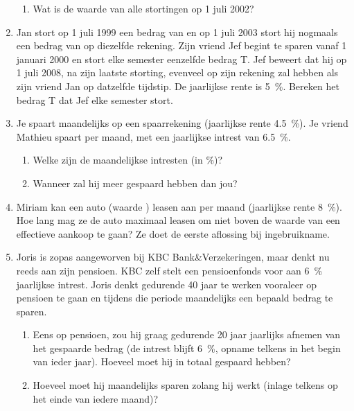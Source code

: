 \begin{enumerate}
\begin{enumerate}
        \item  Wat is de waarde van alle stortingen op 1 juli 2002?
    \end{enumerate}


      \item   Jan stort op 1 juli 1999 een bedrag van  en op 1
    juli 2003 stort hij nogmaals een bedrag van  op
    diezelfde rekening. Zijn vriend Jef begint te sparen vanaf 1
    januari 2000 en stort elke semester eenzelfde bedrag T.  Jef beweert
    dat hij op 1 juli 2008, na zijn laatste storting, evenveel op
    zijn rekening zal hebben als zijn vriend Jan op datzelfde tijdstip.
    De jaarlijkse rente is \SI{5}{\percent}.  Bereken het bedrag T dat Jef elke semester stort.
    
     \item Je spaart maandelijks  op een spaarrekening
    (jaarlijkse rente \SI{4,5}{\percent}). Je vriend Mathieu
    spaart  per maand, met een jaarlijkse intrest van
    \SI{6,5}{\percent}.
    \begin{enumerate}
        \item Welke zijn de maandelijkse intresten (in \%)?
        \item Wanneer zal hij meer gespaard hebben dan jou?
    \end{enumerate}

    \item Miriam kan een auto (waarde ) leasen aan
     per maand (jaarlijkse rente \SI{8}{\percent}). Hoe lang mag ze de auto
    maximaal leasen om niet boven de waarde van een effectieve
    aankoop te gaan? Ze doet de eerste aflossing bij ingebruikname.

    \item Joris is zopas aangeworven
    bij KBC Bank\&Verzekeringen, maar denkt nu reeds aan zijn
    pensioen. KBC zelf stelt een pensioenfonds voor aan \SI{6}{\percent} jaarlijkse
    intrest. Joris denkt gedurende 40 jaar te werken vooraleer op
    pensioen te gaan en tijdens die periode maandelijks een bepaald
    bedrag te sparen.
    \begin{enumerate}
	\item Eens op pensioen, zou hij graag gedurende 20 jaar
	jaarlijks  afnemen van het gespaarde bedrag (de
	intrest blijft \SI{6}{\percent}, opname telkens in het begin van ieder jaar).
	Hoeveel moet hij in totaal gespaard hebben?
	\item Hoeveel moet hij maandelijks sparen zolang hij werkt (inlage
	telkens op het einde van iedere maand)?
    \end{enumerate}


\end{enumerate}
